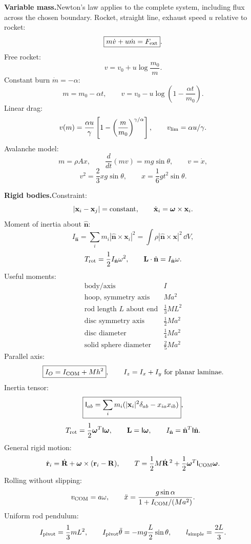 \noindent\textbf{Variable mass.}\quad Newton's law applies to the complete system,
including flux across the chosen boundary. Rocket, straight line, exhaust speed $u$
relative to rocket:
\[
  \boxed{m\dot v+u\dot m=F_{\rm ext}}.
\]
Free rocket:
\[
  \boxed{v=v_0+u\log\frac{m_0}{m}}.
\]
Constant burn $\dot m=-\alpha$:
\[
  m=m_0-\alpha t,\qquad
  v=v_0-u\log\left(1-\frac{\alpha t}{m_0}\right).
\]
Linear drag:
\[
  v(m)=\frac{\alpha u}{\gamma}\left[1-\left(\frac{m}{m_0}\right)^{\gamma/\alpha}\right],
  \qquad v_{\rm lim}=\alpha u/\gamma.
\]
Avalanche model:
\[
  m=\rho Ax,\qquad \frac{d}{dt}(mv)=mg\sin\theta,\qquad v=\dot x,
\]
\[
  \boxed{v^2=\frac{2}{3}xg\sin\theta},\qquad
  \boxed{x=\frac{1}{6}gt^2\sin\theta}.
\]

\noindent\textbf{Rigid bodies.}\quad Constraint:
\[
  |\mathbf x_i-\mathbf x_j|=\text{constant},\qquad
  \dot{\mathbf x}_i=\bm{\omega}\times\mathbf x_i.
\]
Moment of inertia about $\hat{\mathbf n}$:
\[
  I_{\hat{\mathbf n}}=\sum_i m_i|\hat{\mathbf n}\times\mathbf x_i|^2
  =\int\rho|\hat{\mathbf n}\times\mathbf x|^2\,\dd V,
\]
\[
  T_{\rm rot}=\frac{1}{2} I_{\hat{\mathbf n}}\omega^2,\qquad
  \mathbf L\cdot\hat{\mathbf n}=I_{\hat{\mathbf n}}\omega.
\]
Useful moments:
\[
\begin{array}{c|c}
\text{body/axis} & I\\ \hline
\text{hoop, symmetry axis} & Ma^2\\
\text{rod length }L\text{ about end} & \frac13ML^2\\
\text{disc symmetry axis} & \frac12Ma^2\\
\text{disc diameter} & \frac14Ma^2\\
\text{solid sphere diameter} & \frac25Ma^2
\end{array}
\]
Parallel axis:
\[
  \boxed{I_O=I_{\rm COM}+Mh^2},\qquad I_z=I_x+I_y\ \text{for planar laminae}.
\]
Inertia tensor:
\[
  \boxed{\mathsf I_{ab}=\sum_i m_i(|\mathbf x_i|^2\delta_{ab}-x_{ia}x_{ib})},
\]
\[
  T_{\rm rot}=\frac{1}{2}\bm{\omega}^T\mathsf I\bm{\omega},\qquad
  \mathbf L=\mathsf I\bm{\omega},\qquad
  I_{\hat{\mathbf n}}=\hat{\mathbf n}^T\mathsf I\hat{\mathbf n}.
\]
General rigid motion:
\[
  \dot{\mathbf r}_i=\dot{\mathbf R}+\bm{\omega}\times(\mathbf r_i-\mathbf R),\qquad
  T=\frac{1}{2} M\dot{\mathbf R}^{\,2}+\frac{1}{2}\bm{\omega}^T\mathsf I_{\rm COM}\bm{\omega}.
\]
Rolling without slipping:
\[
  v_{\rm COM}=a\omega,\qquad
  \ddot x=\frac{g\sin\alpha}{1+I_{\rm COM}/(Ma^2)}.
\]
Uniform rod pendulum:
\[
  I_{\rm pivot}=\frac13mL^2,\qquad
  I_{\rm pivot}\ddot\theta=-mg\frac{L}{2}\sin\theta,\qquad
  l_{\rm simple}=\frac{2L}{3}.
\]

